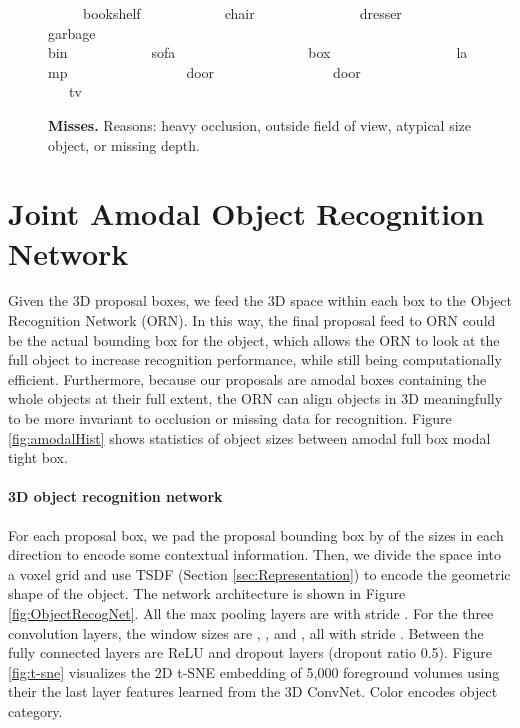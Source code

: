 \documentclass[10pt,twocolumn,letterpaper]{article}
\begin{document}
\begin{figure*}[t]
\vspace{-1.2mm}

{\footnotesize
~~~~~bookshelf~~~~~~~~~~~~chair~~~~~~~~~~~~~~~dresser~~~~~~~~~~garbage bin~~~~~~~~~~~~sofa~~~~~~~~~~~~~~~~~~~box~~~~~~~~~~~~~~~~~~lamp~~~~~~~~~~~~~~~~~door~~~~~~~~~~~~~~~~~door~~~~~~~~~~~~~~~~~~tv}

\vspace{-0.3mm}

\caption{{\bf Misses.} Reasons: heavy occlusion, outside field of view, atypical size object, or missing depth.}
\label{fig:resultMiss}

\vspace{-3mm}
\end{figure*}




\section{Joint Amodal Object Recognition Network}
\label{sec:ObjectClassificationNetwork}
Given the 3D proposal boxes, we feed the 3D space within each box to the Object Recognition Network (ORN).
In this way, 
the final proposal feed to ORN could be the actual bounding box for the object,
which allows the ORN to look at the full object to increase recognition performance,
while still being computationally efficient.
Furthermore,
because our proposals are amodal boxes containing the whole objects at their full extent,
the ORN can align objects in 3D meaningfully to be more invariant to occlusion or missing data for recognition.
Figure \ref{fig:amodalHist} shows statistics of object sizes between amodal full box \vs modal tight box.


\vspace{-4mm}\paragraph{3D object recognition network}
For each proposal box, 
we pad the proposal bounding box by  of the sizes in each direction to encode some contextual information.
Then, we divide the space into a  voxel grid and use TSDF (Section \ref{sec:Representation}) to encode the geometric shape of the object.
The network architecture is shown in Figure \ref{fig:ObjectRecogNet}.
All the max pooling layers are  with stride .
For the three convolution layers, 
the window sizes are , , and , all with stride .
Between the fully connected layers are ReLU and dropout layers (dropout ratio 0.5).  Figure \ref{fig:t-sne} visualizes the 2D t-SNE embedding of 5,000 foreground volumes using their the last layer features learned from the 3D ConvNet. Color encodes object category.
\end{document}
